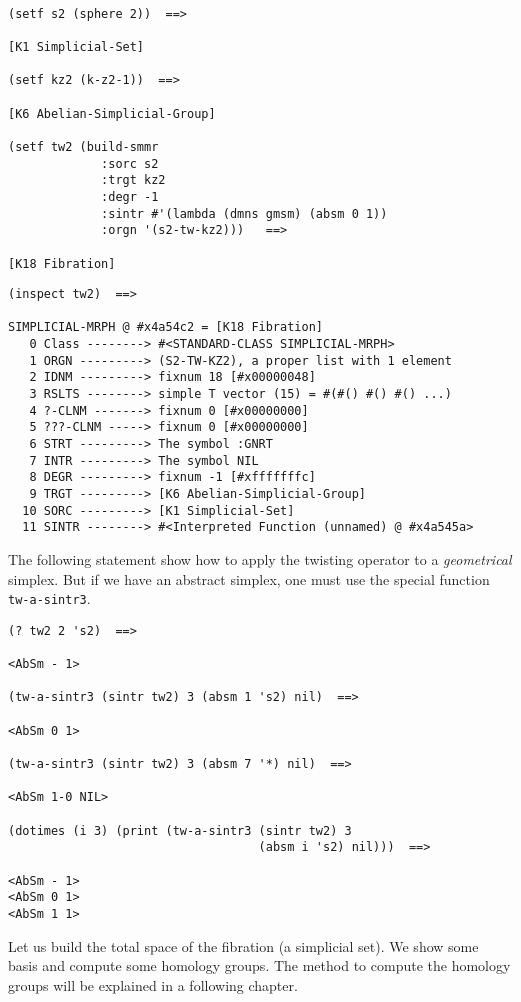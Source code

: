 {\footnotesize\begin{verbatim}

(setf s2 (sphere 2))  ==>

[K1 Simplicial-Set]

(setf kz2 (k-z2-1))  ==>

[K6 Abelian-Simplicial-Group]

(setf tw2 (build-smmr
             :sorc s2
             :trgt kz2
             :degr -1
             :sintr #'(lambda (dmns gmsm) (absm 0 1))
             :orgn '(s2-tw-kz2)))   ==>

[K18 Fibration]
\end{verbatim}}
\newpage
{\footnotesize\begin{verbatim}
(inspect tw2)  ==>

SIMPLICIAL-MRPH @ #x4a54c2 = [K18 Fibration]
   0 Class --------> #<STANDARD-CLASS SIMPLICIAL-MRPH>
   1 ORGN ---------> (S2-TW-KZ2), a proper list with 1 element
   2 IDNM ---------> fixnum 18 [#x00000048]
   3 RSLTS --------> simple T vector (15) = #(#() #() #() ...)
   4 ?-CLNM -------> fixnum 0 [#x00000000]
   5 ???-CLNM -----> fixnum 0 [#x00000000]
   6 STRT ---------> The symbol :GNRT
   7 INTR ---------> The symbol NIL
   8 DEGR ---------> fixnum -1 [#xfffffffc]
   9 TRGT ---------> [K6 Abelian-Simplicial-Group]
  10 SORC ---------> [K1 Simplicial-Set]
  11 SINTR --------> #<Interpreted Function (unnamed) @ #x4a545a>
\end{verbatim}}
The following statement show how to apply the twisting operator to a 
{\em geometrical} simplex. But if we have an abstract simplex, one must
use the special function {\tt tw-a-sintr3}.
{\footnotesize\begin{verbatim}
(? tw2 2 's2)  ==>

<AbSm - 1>

(tw-a-sintr3 (sintr tw2) 3 (absm 1 's2) nil)  ==>

<AbSm 0 1>

(tw-a-sintr3 (sintr tw2) 3 (absm 7 '*) nil)  ==>

<AbSm 1-0 NIL>

(dotimes (i 3) (print (tw-a-sintr3 (sintr tw2) 3 
                                   (absm i 's2) nil)))  ==>

<AbSm - 1> 
<AbSm 0 1> 
<AbSm 1 1> 
\end{verbatim}}
Let us build the total space of the fibration (a simplicial set). We show some basis and compute
some homology groups. The method to compute the homology groups will be explained in a following
chapter.
